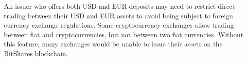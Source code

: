 An issuer who offers both USD and EUR deposits may need to restrict direct
trading between their USD and EUR assets to avoid being subject to foreign
currency exchange regulations. Some cryptocurrency exchanges allow trading
between fiat and cryptocurrencies, but not between two fiat currencies.
Without this feature, many exchanges would be unable to issue their assets on
the BitShares blockchain.
